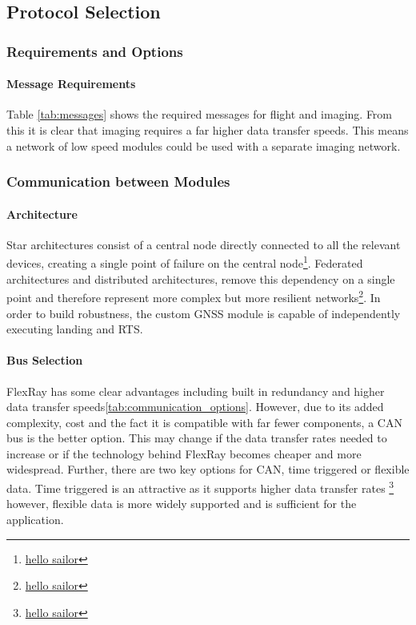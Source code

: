 \subsection{Protocol Selection}

\subsubsection{Requirements and Options}
\paragraph{Message Requirements}
Table \ref{tab:messages} shows the required messages for flight and imaging. From this it is clear that imaging requires a far higher data transfer speeds. This means a network of low speed modules could be used with a separate imaging network.



\subsubsection{Communication between Modules}
\paragraph{Architecture}
Star architectures consist of a central node directly connected to all the relevant devices, creating a single point of failure on the central node\footnote{\url{hello sailor}}. Federated architectures and distributed architectures, remove this dependency on a single point and therefore represent more complex but more resilient networks\footnote{\url{hello sailor}}. In order to build robustness, the custom \gls{GNSS} module is capable of independently executing landing and \gls{RTS}.  
\paragraph{Bus Selection}
FlexRay has some clear advantages including built in redundancy and higher data transfer speeds\ref{tab:communication_options}. However, due to its added complexity, cost and the fact it is compatible with far fewer components, a \gls{CAN} bus is the better option. This may change if the data transfer rates needed to increase or if the technology behind FlexRay becomes cheaper and more widespread. Further, there are two key options for \gls{CAN}, time triggered or flexible data. Time triggered is an attractive as it supports higher data transfer rates \footnote{\url{hello sailor}} however, flexible data is more widely supported and is sufficient for the application.
